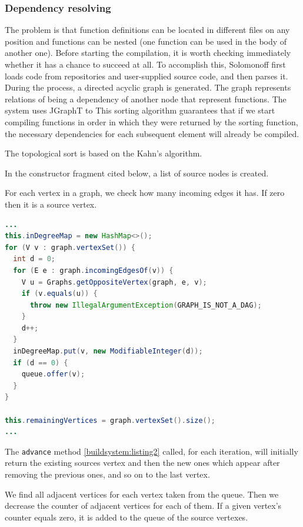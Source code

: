 \hypertarget{dependency-resolving}{%
\subsubsection{Dependency resolving}\label{dependency-resolving}}

The problem is that function definitions can be located in different
files on any position and functions can be nested (one function can be
used in the body of another one). Before starting the compilation, it is
worth checking immediately whether it has a chance to succeed at all. To
accomplish this, Solomonoff first loads code from repositories and
user-supplied source code, and then parses it. During the process,
a directed acyclic graph is
generated. The graph represents relations of being a dependency of
another node that represent functions. The system uses JGraphT to
This sorting algorithm guarantees that if we start compiling functions
in order in which they were returned by the sorting function,
the necessary dependencies for each subsequent element will already
be compiled.

The topological sort is based on the Kahn's algorithm.

In the constructor fragment cited below, a list of source nodes is
created.

For each vertex in a graph, we check how many incoming edges it has.
If zero then it is a source vertex.

\begin{lstlisting}[language=Java, caption={Kahn's algorithm 1}, label={buildsystem:listing1}, caption={%
  Implementation of the algorithm from the JGraphT library pt. 1 \cite{JGRAPHT}%
}]
...
this.inDegreeMap = new HashMap<>();
for (V v : graph.vertexSet()) {
  int d = 0;
  for (E e : graph.incomingEdgesOf(v)) {
    V u = Graphs.getOppositeVertex(graph, e, v);
    if (v.equals(u)) {
      throw new IllegalArgumentException(GRAPH_IS_NOT_A_DAG);
    }
    d++;
  }
  inDegreeMap.put(v, new ModifiableInteger(d));
  if (d == 0) {
    queue.offer(v);
  }
}

this.remainingVertices = graph.vertexSet().size();
...
\end{lstlisting}

The \texttt{advance} method \ref{buildsystem:listing2} called, for each iteration, will initially return the
existing sources vertex and then the new ones which appear after
removing the previous ones, and so on to the last vertex.

We find all adjacent vertices for each vertex taken from the queue.
Then we decrease the counter of adjacent vertices for each of them.
If a given vertex's counter equals zero, it is added to the queue of the source vertexes.


